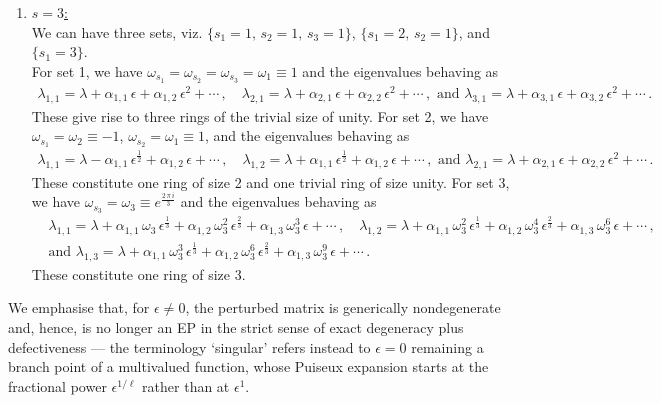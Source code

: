 \documentclass[aps, prb, onecolumn, nofootinbib, citeautoscript, 10pt]{revtex4-2}
\def \nn{\nonumber \\}
\begin{document}
\begin{enumerate}
\item \underline{$s = 3$:}
\\We can have three sets, viz. $\lbrace s_1=1, \, s_2 = 1, \, s_3 = 1 \rbrace$, $ \lbrace s_1= 2 , \, s_2 = 1 \rbrace $,
and $ \lbrace s_1= 3 \rbrace $.
\\For set 1, we have $\omega_{s_1} = \omega_{s_2} = \omega_{s_3} = \omega_1 \equiv 1$ and the eigenvalues behaving as
\begin{align}
\lambda_{1, 1} = \lambda + \alpha_{1, 1}\, \epsilon
+ \alpha_{1, 2}\,\epsilon^2 + \cdots\,, \quad
\lambda_{2, 1} = \lambda + \alpha_{2, 1}\, \epsilon
+ \alpha_{2, 2}\,\epsilon^2 + \cdots \,, \text{ and }
\lambda_{3, 1} = \lambda + \alpha_{3, 1}\, \epsilon
+ \alpha_{3, 2}\,\epsilon^2 + \cdots \,.
\end{align}
These give rise to three rings of the trivial size of unity.
For set 2, we have $\omega_{s_1} =  \omega_2 \equiv - 1 $, $\omega_{s_2} =  \omega_1 \equiv 1 $, and the eigenvalues behaving as
\begin{align}
\label{ep3-sqrt}
\lambda_{1, 1} = \lambda - \alpha_{1, 1}\, \epsilon^{\frac{1}{2}}
+ \alpha_{1, 2}\, \epsilon + \cdots\,, \quad
\lambda_{1, 2} = \lambda + \alpha_{1, 1} \, \epsilon^{\frac{1}{2}}
+ \alpha_{1, 2} \,\epsilon + \cdots \,, \text{ and }
\lambda_{2, 1} = \lambda + \alpha_{2, 1}\, \epsilon
+ \alpha_{2, 2}\,\epsilon^2 + \cdots \,.
\end{align}
These constitute one ring of size 2 and one trivial ring of size unity.
For set 3, we have $\omega_{s_3} =  \omega_3  \equiv e^{\frac{2\,\pi\,i} {3}} $ and the eigenvalues behaving as
\begin{align}
& \lambda_{1, 1} = \lambda + \alpha_{1, 1}\, \omega_3 \,\epsilon^{\frac{1}{3}}
+ \alpha_{1, 2}\, \omega_3^2 \,\epsilon^{\frac{2}{3}} 
+ \alpha_{1, 3}\, \omega_3^3 \,\epsilon + \cdots\,, \quad
\lambda_{1, 2} = \lambda + \alpha_{1, 1} \, \omega_3^2\, \epsilon^{\frac{1}{3}}
+ \alpha_{1, 2} \, \omega_3^4 \,\epsilon^{\frac{2}{3}} 
+ \alpha_{1, 3}\, \omega_3^6 \,\epsilon + \cdots \,,
\nn & \text{and }
\lambda_{1, 3} = \lambda + \alpha_{1, 1} \, \omega_3^3\, \epsilon^{\frac{1}{3}}
+ \alpha_{1, 2} \, \omega_3^6 \,\epsilon^{\frac{2}{3}} 
+ \alpha_{1, 3}\, \omega_3^9 \,\epsilon + \cdots\,.
\end{align}
These constitute one ring of size 3.
 
 
\end{enumerate}
We emphasise that, for $\epsilon \neq 0$, the perturbed matrix is generically nondegenerate and, hence, is no longer an EP in the strict sense of exact degeneracy plus defectiveness --- the terminology `singular' refers instead to $\epsilon=0$ remaining a branch point of a multivalued function, whose Puiseux expansion starts at the fractional power $\epsilon^{1/\ell}$ rather than at $\epsilon^1$.
\end{document}

